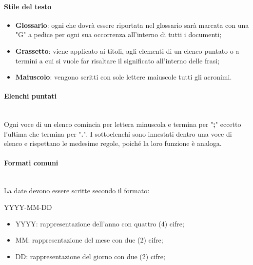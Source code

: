 		\paragraph{Stile del testo}
		\begin{itemize}
			\item \textbf{Glossario}: ogni che dovrà essere riportata nel glossario sarà marcata con una "G" a pedice per ogni sua occorrenza all'interno di tutti i documenti;
			\item \textbf{Grassetto}: viene applicato ai titoli, agli elementi di un elenco puntato o a termini a cui si vuole far risaltare il significato all'interno delle frasi;
			\item \textbf{Maiuscolo}: vengono scritti con sole lettere maiuscole tutti gli acronimi.
		\end{itemize}
		\paragraph{Elenchi puntati} \mbox{}\\
		Ogni voce di un elenco comincia per lettera minuscola e termina per "\textbf{;}" eccetto l'ultima che termina per "\textbf{.}". I sottoelenchi sono innestati dentro una voce di elenco e rispettano le medesime regole, poiché la loro funzione è analoga.
		\paragraph{Formati comuni} \mbox{}\\
		La date devono essere scritte secondo il formato: \newline
		\centerline{YYYY-MM-DD}
		\begin{itemize}
			\item YYYY: rappresentazione dell'anno con quattro (4) cifre;
			\item MM: rappresentazione del mese con due (2) cifre;
			\item DD: rappresentazione del giorno con due (2) cifre;			
		\end{itemize}
